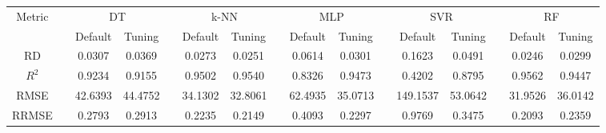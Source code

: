 \begin{table}[!htbp]
	\setlength{\tabcolsep}{3pt}
	\begin{tabular}{cccccccccccccccc}
		\toprule
		\multirow{2}{*}{Metric} & & \multicolumn{2}{c}{DT} & & \multicolumn{2}{c}{k-NN} & & \multicolumn{2}{c}{MLP} & & \multicolumn{2}{c}{SVR} & & \multicolumn{2}{c}{RF}\\
		 \cline{3-4} \cline{6-7} \cline{9-10} \cline{12-13} \cline{15-16}
		  & & Default & Tuning & & Default & Tuning & & Default & Tuning & & Default & Tuning & & Default & Tuning\\
		\midrule
		RD & & 0.0307 & 0.0369 & & 0.0273 & 0.0251 & & 0.0614 & 0.0301 & & 0.1623 & 0.0491 & & 0.0246 & 0.0299\\
		$R^2$ & & 0.9234 & 0.9155 & & 0.9502 & 0.9540 & & 0.8326 & 0.9473 & & 0.4202 & 0.8795 & & 0.9562 & 0.9447\\
		RMSE & & 42.6393 & 44.4752 & & 34.1302 & 32.8061 & & 62.4935 & 35.0713 & & 149.1537 & 53.0642 & & 31.9526 & 36.0142\\
		RRMSE & & 0.2793 & 0.2913 & & 0.2235 & 0.2149 & & 0.4093 & 0.2297 & & 0.9769 & 0.3475 & & 0.2093 & 0.2359\\
		\bottomrule
	\end{tabular}
\end{table}
